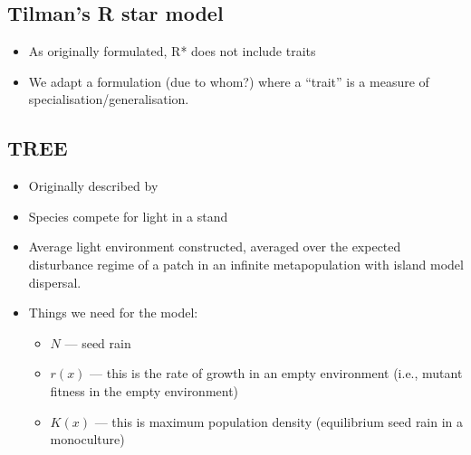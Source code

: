 \subsection{Tilman's R star model}
\begin{itemize}
\item As originally formulated, R* does not include traits
\item We adapt a formulation (due to whom?) where a ``trait'' is a
  measure of specialisation/generalisation.
\end{itemize}


\subsection{TREE}
\begin{itemize}
\item Originally described by \citet{Falster-2011}
\item Species compete for light in a stand
\item Average light environment constructed, averaged over the
  expected disturbance regime of a patch in an infinite metapopulation
  with island model dispersal.
\item Things we need for the model:
  \begin{itemize}
  \item $N$ --- seed rain
  \item $r(x)$ --- this is the rate of growth in an empty environment
    (i.e., mutant fitness in the empty environment)
  \item $K(x)$ --- this is maximum population density (equilibrium
    seed rain in a monoculture)
  \end{itemize}
\end{itemize}
